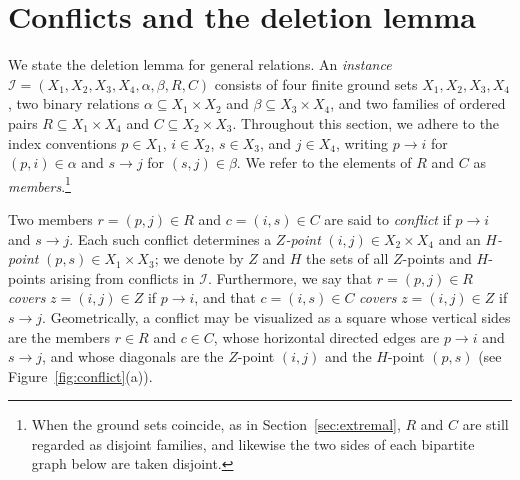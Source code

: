 \documentclass[11pt]{amsart}
\theoremstyle{remark}
\begin{document}
\section{Conflicts and the deletion lemma}\label{sec:conflicts}

We state the deletion lemma for general relations. An \emph{instance} $\mathcal I=(X_1,X_2,X_3,X_4,\alpha,\beta,R,C)$ consists of four finite ground sets $X_1,X_2,X_3,X_4$, two binary relations $\alpha\subseteq X_1\times X_2$ and $\beta\subseteq X_3\times X_4$, and two families of ordered pairs $R\subseteq X_1\times X_4$ and $C\subseteq X_2\times X_3$. Throughout this section, we adhere to the index conventions $p\in X_1$, $i\in X_2$, $s\in X_3$, and $j\in X_4$, writing $p\to i$ for $(p,i)\in\alpha$ and $s\to j$ for $(s,j)\in\beta$. We refer to the elements of $R$ and $C$ as \emph{members}.\footnote{When the ground sets coincide, as in Section~\ref{sec:extremal}, $R$ and $C$ are still regarded as disjoint families, and likewise the two sides of each bipartite graph below are taken disjoint.}

Two members $r=(p,j)\in R$ and $c=(i,s)\in C$ are said to \emph{conflict} if $p\to i$ and $s\to j$. Each such conflict determines a \emph{$Z$-point} $(i,j)\in X_2\times X_4$ and an \emph{$H$-point} $(p,s)\in X_1\times X_3$; we denote by $Z$ and $H$ the sets of all $Z$-points and $H$-points arising from conflicts in $\mathcal I$. Furthermore, we say that $r=(p,j)\in R$ \emph{covers} $z=(i,j)\in Z$ if $p\to i$, and that $c=(i,s)\in C$ \emph{covers} $z=(i,j)\in Z$ if $s\to j$. Geometrically, a conflict may be visualized as a square whose vertical sides are the members $r\in R$ and $c\in C$, whose horizontal directed edges are $p\to i$ and $s\to j$, and whose diagonals are the $Z$-point $(i,j)$ and the $H$-point $(p,s)$ (see Figure~\ref{fig:conflict}(a)).
\end{document}
